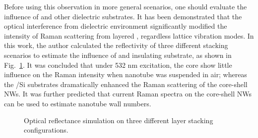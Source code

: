 Before using this observation in more general scenarios, one should evaluate the influence of  and other dielectric substrates. It has been demonstrated that the optical interference from dielectric environment significantly modified the intensity of Raman scattering from layered , regardless lattice vibration modes.\cite{Li2012} In this work, the author calculated the reflectivity of three different stacking scenarios to estimate the influence of  and insulating substrate, as shown in Fig.~\ref{fig:ch5ws2stk}. It was concluded that under 532 nm excitation, the  core show little influence on the Raman intensity when  nanotube was suspended in air; whereas the /Si substrates dramatically enhanced the Raman scattering of the core-shell NWs. It was further predicted that current Raman spectra on the core-shell NWs can be used to estimate  nanotube wall numbers. 

\begin{figure}[htb]
\centering
{}\hspace{0.03\textwidth}
\hspace{0.03\textwidth}
\caption[Optical reflectance simulation on three different  layer stacking configurations]{Optical reflectance simulation on three different  layer stacking configurations.}
\label{fig:ch5ws2stk}
\end{figure}

